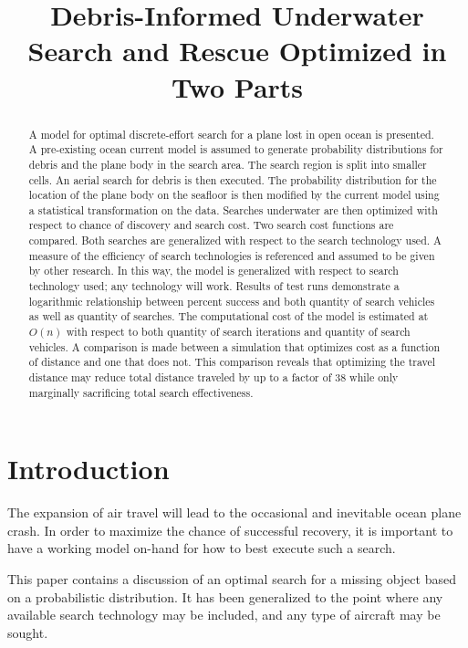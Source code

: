 \documentclass[a4paper]{article}
\title{Debris-Informed Underwater Search and Rescue Optimized in Two Parts}
\author{}
\date{}
\begin{document}
\maketitle

\begin{abstract}
A model for optimal discrete-effort search for a plane lost in open ocean is presented. A pre-existing ocean current model is assumed to generate probability distributions for debris and the plane body in the search area. The search region is split into smaller cells. An aerial search for debris is then executed. The probability distribution for the location of the plane body on the seafloor is then modified by the current model using a statistical transformation on the data. Searches underwater are then optimized with respect to chance of discovery and search cost. Two search cost functions are compared. Both searches are generalized with respect to the search technology used. A measure of the efficiency of search technologies is referenced and assumed to be given by other research. In this way, the model is generalized with respect to search technology used; any technology will work. Results of test runs demonstrate a logarithmic relationship between percent success and both quantity of search vehicles as well as quantity of searches. The computational cost of the model is estimated at $O(n)$ with respect to both quantity of search iterations and quantity of search vehicles. A comparison is made between a simulation that optimizes cost as a function of distance and one that does not. This comparison reveals that optimizing the travel distance may reduce total distance traveled by up to a factor of 38 while only marginally sacrificing total search effectiveness.
\end{abstract}

\pagebreak 

\section{Introduction}

The expansion of air travel will lead to the occasional and inevitable ocean plane crash. In order to maximize the chance of successful recovery, it is important to have a working model on-hand for how to best execute such a search. 

This paper contains a discussion of an optimal search for a missing object based on a probabilistic distribution. It has been generalized to the point where any available search technology may be included, and any type of aircraft may be sought.
\end{document}
